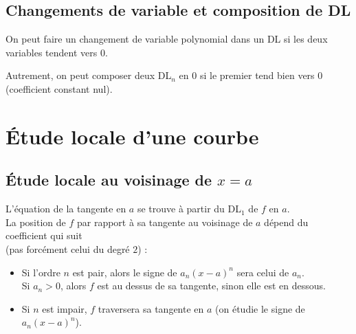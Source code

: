     \subsection{Changements de variable et composition de DL}

        On peut faire un changement de variable polynomial dans un DL si les deux variables tendent vers $0$.
        \medskip

        Autrement, on peut composer deux DL$_n$ en $0$ si le premier tend bien vers $0$ (coefficient constant nul).



\section{Étude locale d'une courbe}

    \subsection{Étude locale au voisinage de $x = a$}

        L'équation de la tangente en $a$ se trouve à partir du DL$_1$ de $f$ en $a$.\\

        La position de $f$ par rapport à sa tangente au voisinage de $a$ dépend du coefficient qui suit\\(pas forcément celui du degré $2$) :\\
        \begin{itemize}
            \item Si l'ordre $n$ est pair, alors le signe de $a_n (x - a)^n$ sera celui de $a_n$.\\
            Si $a_n > 0$, alors $f$ est au dessus de sa tangente, sinon elle est en dessous.
            \item Si $n$ est impair, $f$ traversera sa tangente en $a$ (on étudie le signe de $a_n (x - a)^n$).
        \end{itemize}

